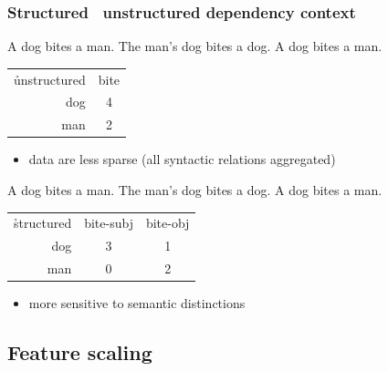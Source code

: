\documentclass[t]{beamer} %
\begin{document}
\begin{frame}
  \frametitle{Structured \vs\ unstructured dependency context}

  A dog bites a man. The man's dog bites a dog.  A dog bites a man.
  
  \begin{center}
    \begin{tabular}{r|c}
      \h{unstructured} &  bite \\
      dog & 4 \\
      man & 2 
    \end{tabular}
  \end{center}
  \begin{itemize}
  \item[\So] data are less sparse (all syntactic relations aggregated)
  \end{itemize}

  \gap[2]
  A dog bites a man. The man's dog bites a dog.  A dog bites a man.
  
   \begin{center}
     \begin{tabular}{r|c|c}
       \h{structured} &  bite-subj & bite-obj \\
       dog & 3 & 1 \\
       man & 0  & 2
     \end{tabular}
   \end{center}
  \begin{itemize}
  \item[\So] more sensitive to semantic distinctions
  \end{itemize}
\end{frame}

\subsection{Feature scaling}

\end{document}
